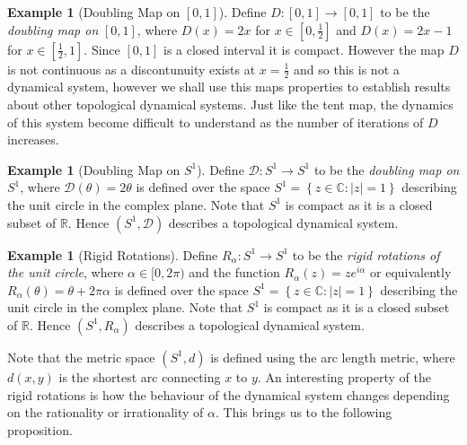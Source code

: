 \documentclass[11pt,a4paper,oneside]{memoir}
\theoremstyle{plain}
\theoremstyle{definition}
\newtheorem{exmp}[thm]{Example}
\begin{document}
\begin{exmp}[Doubling Map on $\left\lbrack 0, 1 \right\rbrack$] \label{exmp:doubling-map}
    Define $D: [0,1] \to [0,1]$ to be the \emph{doubling map on} $[0, 1]$, where $D(x) = 2x$ for $x \in \left[0, \frac{1}{2}\right]$ and $D(x) = 2x - 1$ for $x \in \left[\frac{1}{2}, 1\right]$. Since $[0, 1]$ is a closed interval it is compact. However the map $D$ is not continuous as a discontunuity exists at $x = \frac{1}{2}$ and so this is not a dynamical system, however we shall use this maps properties to establish results about other topological dynamical systems. Just like the tent map, the dynamics of this system become difficult to understand as the number of iterations of $D$ increases.
\end{exmp}

\begin{exmp}[Doubling Map on $S^1$] \label{exmp:doubling-map-s1}
    Define $\mathcal{D}: S^1 \to S^1$ to be the \emph{doubling map on} $S^1$, where $\mathcal{D}(\theta) = 2\theta$ is defined over the space $S^1 = \left\lbrace z \in \mathbb{C}: |z| = 1 \right\rbrace$ describing the unit circle in the complex plane. Note that $S^1$ is compact as it is a closed subset of $\mathbb{R}$. Hence $(S^1, \mathcal{D})$ describes a topological dynamical system.
\end{exmp}

\begin{exmp}[Rigid Rotations] \label{exmp:rigid-rotations}
    Define $R_\alpha: S^1 \to S^1$ to be the \emph{rigid rotations of the unit circle}, where $\alpha \in [0, 2\pi)$ and the function $R_{\alpha}(z) = ze^{i\alpha}$ or equivalently $R_\alpha(\theta) = \theta + 2\pi \alpha$ is defined over the space $S^1 = \left\lbrace z \in \mathbb{C}: |z| = 1 \right\rbrace$ describing the unit circle in the complex plane. Note that $S^1$ is compact as it is a closed subset of $\mathbb{R}$. Hence $(S^1, R_{\alpha})$ describes a topological dynamical system.
\end{exmp}

Note that the metric space $(S^1, d)$ is defined using the arc length metric, where $d(x, y)$ is the shortest arc connecting $x$ to $y$. An interesting property of the rigid rotations is how the behaviour of the dynamical system changes depending on the rationality or irrationality of $\alpha$. This brings us to the following proposition.
\end{document}
